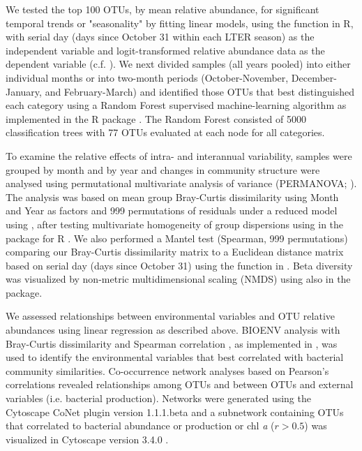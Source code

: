 We tested the top 100 OTUs, by mean relative abundance, for significant temporal trends or "seasonality" by fitting linear models, using the  function in R, with serial day (days since October 31 within each LTER season) as the independent variable and logit-transformed relative abundance data as the dependent variable (c.f. \citealt{chow2013temporal}). We next divided samples (all years pooled) into either individual months or into two-month periods (October-November, December-January, and February-March) and identified those OTUs that best distinguished each category using a Random Forest supervised machine-learning algorithm as implemented in the R package  \citep{Breiman2001-og,Liaw2002-zv}. The Random Forest consisted of 5000 classification trees with 77 OTUs evaluated at each node for all categories. 

To examine the relative effects of intra- and interannual variability, samples were grouped by month and by year and changes in community structure were analysed using permutational multivariate analysis of variance (PERMANOVA; \citep{McArdle2001-zn}). The analysis was based on mean group Bray-Curtis dissimilarity using Month and Year as factors and 999 permutations of residuals under a reduced model using , after testing multivariate homogeneity of group dispersions using  in the  package for R \citep{Oksanen_2015}. We also performed a Mantel test (Spearman, 999 permutations) comparing our Bray-Curtis dissimilarity matrix to a Euclidean distance matrix based on serial day (days since October 31) using the  function in  \citep{Oksanen_2015}. Beta diversity was visualized by non-metric multidimensional scaling (NMDS) using  also in the  package. 

We assessed relationships between environmental variables and OTU relative abundances using linear regression as described above. BIOENV analysis with Bray-Curtis dissimilarity and Spearman correlation \citep{Clarke1993-qq}, as implemented in , was used to identify the environmental variables that best correlated with bacterial community similarities. Co-occurrence network analyses based on Pearson's correlations revealed relationships among OTUs and between OTUs and external variables (i.e. bacterial production). Networks were generated using the Cytoscape CoNet plugin version 1.1.1.beta and a subnetwork containing OTUs that correlated to bacterial abundance or production or chl \emph{a} ($r > 0.5$) was visualized in Cytoscape version 3.4.0   \citep{faust2012microbial,smobwr}.

